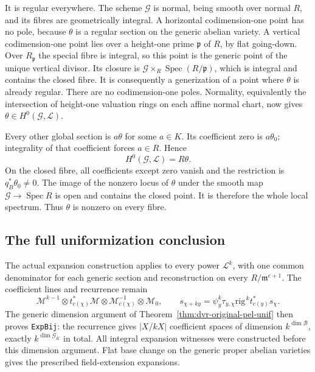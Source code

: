 It is regular everywhere.  The scheme $\mathcal G$ is normal,
being smooth over normal $R$, and its fibres are geometrically
integral.  A horizontal codimension-one point has no pole, because
$\theta$ is a regular section on the generic abelian variety.
A vertical codimension-one point lies over a height-one prime
$\mathfrak p$ of $R$, by flat going-down.  Over $R_{\mathfrak p}$
the special fibre is integral, so this point is the generic point
of the unique vertical divisor.  Its closure is
$\mathcal G\times_R\operatorname{Spec}(R/\mathfrak p)$, which
is integral and contains the closed fibre.  It is consequently a
generization of a point where $\theta$ is already regular.
There are no codimension-one poles.  Normality, equivalently the
intersection of height-one valuation rings on each affine normal
chart, now gives
$\theta\in H^0(\mathcal G,\mathscr L)$.

Every other global section is $a\theta$ for some $a\in K$.
Its coefficient zero is $a\theta_0$; integrality of that
coefficient forces $a\in R$.  Hence
\[
                   H^0(\mathcal G,\mathscr L)=R\theta.
\]
On the closed fibre, all coefficients except zero vanish and the
restriction is $q_B^*\theta_0\ne0$.  The image of the nonzero
locus of $\theta$ under the smooth map
$\mathcal G\to\operatorname{Spec}R$ is open and contains the
closed point.  It is therefore the whole local spectrum.  Thus
$\theta$ is nonzero on every fibre.

\subsection*{The full uniformization conclusion}

The actual expansion construction applies to every power
$\mathscr L^k$, with one common denominator for each generic
section and reconstruction on every $R/\mathfrak m^{e+1}$.
The coefficient lines and recurrence remain
\[
 \mathscr M^{k-1}\otimes t_{c(\chi)}^*\mathscr M
             \otimes\mathscr M_{c(\chi)}^{-1}\otimes\mathscr M_0,
 \qquad
 s_{\chi+ky}=\psi_y^k\tau_{y,\chi}\mathrm{rig}^{\,k}
                                      t_{c(y)}^*s_\chi.
\]
The generic dimension argument of
Theorem~\ref{thm:dvr-original-pel-unif} then proves \texttt{ExpBij}:
the recurrence gives $|X/kX|$ coefficient spaces of dimension
$k^{\dim\mathcal B}$, exactly $k^{\dim\mathcal G_K}$ in total.
All integral expansion witnesses were constructed before this
dimension argument.  Flat base change on the generic proper
abelian varieties gives the prescribed field-extension expansions.

